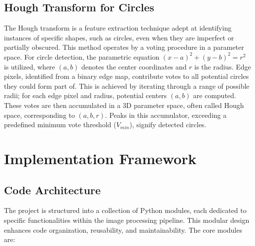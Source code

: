 \documentclass[12pt,a4paper]{article}
\begin{document}
\subsection{Hough Transform for Circles}
\label{subsec:circle_detection}
The Hough transform is a feature extraction technique adept at identifying instances of specific shapes, such as circles, even when they are imperfect or partially obscured. This method operates by a voting procedure in a parameter space. For circle detection, the parametric equation $(x-a)^2 + (y-b)^2 = r^2$ is utilized, where $(a,b)$ denotes the center coordinates and $r$ is the radius. Edge pixels, identified from a binary edge map, contribute votes to all potential circles they could form part of. This is achieved by iterating through a range of possible radii; for each edge pixel and radius, potential centers $(a,b)$ are computed. These votes are then accumulated in a 3D parameter space, often called Hough space, corresponding to $(a,b,r)$. Peaks in this accumulator, exceeding a predefined minimum vote threshold ($V_{min}$), signify detected circles. 


\section{Implementation Framework}

\subsection{Code Architecture}
The project is structured into a collection of Python modules, each dedicated to specific functionalities within the image processing pipeline. This modular design enhances code organization, reusability, and maintainability. The core modules are:
\end{document}
